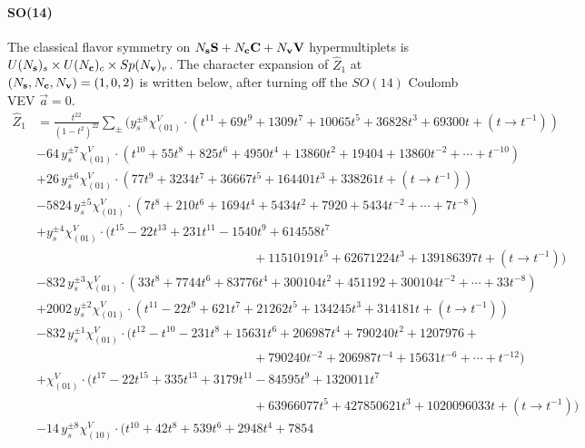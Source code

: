 \documentclass[letterpaper, 11pt]{article}
\newcommand{\nn}{\nonumber}
\begin{document}
{  \paragraph{SO(14)} The classical flavor symmetry  on $N_{\bf s} \mathbf{S}+N_{\bf c} \mathbf{C}+ N_{\bf v} \mathbf{V}$ hypermultiplets is $U(N_{\bf s})_s \times U(N_{\bf c})_c  \times Sp(N_{\bf v})_v$. The character expansion of  $\hat{Z}_1$ at $(N_{\bf s},N_{\bf c}, N_{\bf v}) = (1,0,2)$ is written below, after turning off the $SO(14)$ Coulomb VEV $\vec{a} = 0$. 
  \begin{align}
  \label{eq:so14-s1v2}
  \hat{Z}_1&=\frac{t^{22}}{(1-t^2)^{22}}\sum_{\pm}\Big(y_s^{\pm8}\chi^V_{(01)}\cdot (t^{11}+69 t^9+1309 t^7+10065 t^5+36828 t^3+69300
  t+  (t\rightarrow t^{-1}) )\nn\\
  &-64\,y_s^{\pm7}\chi^V_{(01)}\cdot (t^{10}+55 t^8+825 t^6+4950 t^4+13860
  t^2+19404+13860t^{-2} + \cdots + t^{-10})\nn\\
  &+26\,y_s^{\pm6}\chi^V_{(01)}\cdot (77 t^9+3234 t^7+36667 t^5+164401 t^3+338261
  t+  (t\rightarrow t^{-1}))\nn\\
  &-5824\,y_s^{\pm5}\chi^V_{(01)}\cdot (7 t^8+210 t^6+1694 t^4+5434
  t^2+7920+ 5434t^{-2} + \cdots + 7t^{-8}) \nn\\
  &+y_s^{\pm4}\chi^V_{(01)}\cdot (t^{15}-22 t^{13}+231 t^{11}-1540 t^9+614558 t^7\nn\\
  &\qquad\qquad\qquad\qquad\qquad\qquad\qquad\qquad\quad +11510191 t^5+62671224 t^3+139186397t+  (t\rightarrow t^{-1}))\nn\\
  &-832\,y_s^{\pm3}\chi^V_{(01)}\cdot (33 t^8+7744 t^6+83776 t^4+300104
  t^2+451192+300104t^{-2} + \cdots + 33t^{-8})\nn\\
  &+2002\,y_s^{\pm2}\chi^V_{(01)}\cdot (t^{11}-22 t^9+621 t^7+21262 t^5+134245 t^3+314181t+  (t\rightarrow t^{-1}) )\nn\\
  &-832\,y_s^{\pm1}\chi^V_{(01)}\cdot (t^{12}-t^{10}-231 t^8+15631 t^6+206987 t^4+790240t^2+1207976+ \nn\\
  &\qquad\qquad\qquad\qquad\qquad\qquad\qquad\qquad\quad +790240t^{-2} +206987 t^{-4} +  15631 t^{-6} + \cdots + t^{-12}) \nn\\
  &+\chi^V_{(01)}\cdot (t^{17}-22 t^{15}+335 t^{13}+3179 t^{11}-84595 t^9+1320011 t^7\nn\\
  &\qquad\qquad\qquad\qquad\qquad\qquad\qquad\qquad\quad +63966077 t^5+427850621 t^3+1020096033t+  (t\rightarrow t^{-1}) ) \nn\\
  &-14\,y_s^{\pm8}\chi^V_{(10)}\cdot  (t^{10}+42 t^8+539 t^6+2948 t^4+7854

\end{align}}
\end{document}
